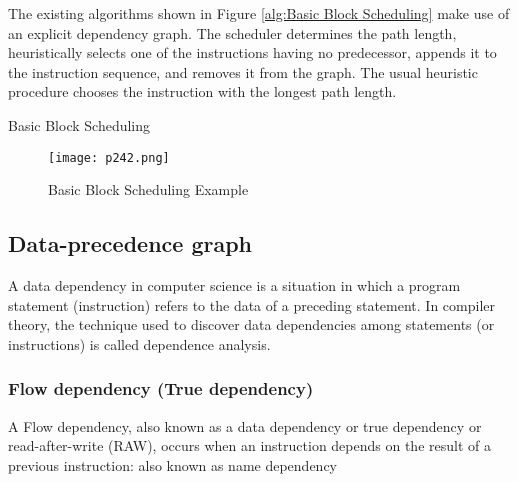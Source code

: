  The existing algorithms shown in Figure \ref{alg:Basic Block Scheduling} make use of an explicit dependency graph. The scheduler
 determines the path length, heuristically selects one of the instructions having 
 no predecessor, appends it to the instruction sequence, and removes it from the graph. The usual
 heuristic procedure chooses the instruction with the longest path length.

 \begin{algorithm}
	\caption{Basic Block Scheduling}\label{alg:Basic Block Scheduling}
	\begin{algorithmic}

        \EndWhile
	\end{algorithmic}
\end{algorithm}


\begin{figure}[H]
	\centering
	\texttt{[image: p242.png]}
	\caption{Basic Block Scheduling Example}
	\label{fig:p242}
\end{figure}




\subsection{Data-precedence graph}


A data dependency\cite{Datadepe9:online} in computer science is a situation in which a program statement (instruction) refers to the data of a preceding statement. In compiler theory, the technique used to discover data dependencies among statements (or instructions) is called dependence analysis.


\subsubsection{Flow dependency (True dependency)}

A Flow dependency, also known as a data dependency or true dependency or read-after-write (RAW), occurs when an instruction depends on the result of a previous instruction: also known as name dependency


